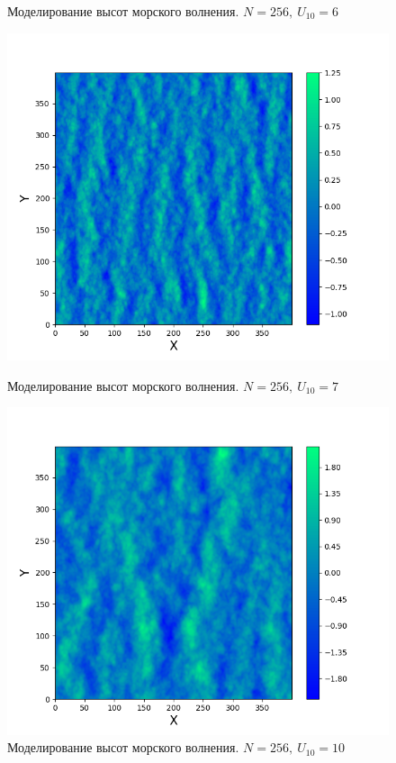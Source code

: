 \begin{figure}[h!]
\begin{minipage}[h]{0.45\linewidth}
	\caption{Моделирование высот морского волнения. $N=256, ~ U_{10}=6$ }
	\label{fig:water6}
\end{minipage}

\vfill
\begin{minipage}[h]{0.45\linewidth}
	\centering
	\includegraphics[width=\linewidth]{img/water7.png}
	\caption{Моделирование высот морского волнения. $N=256, ~ U_{10}=7$  }
	\label{fig:water7}
\end{minipage}
\hfill
\begin{minipage}[h]{0.45\linewidth}
	\centering
	\includegraphics[width=\linewidth]{img/water10.png}
	\caption{Моделирование высот морского волнения. $N=256, ~ U_{10}=10$ }
	\label{fig:water10}
\end{minipage}
\end{figure}


